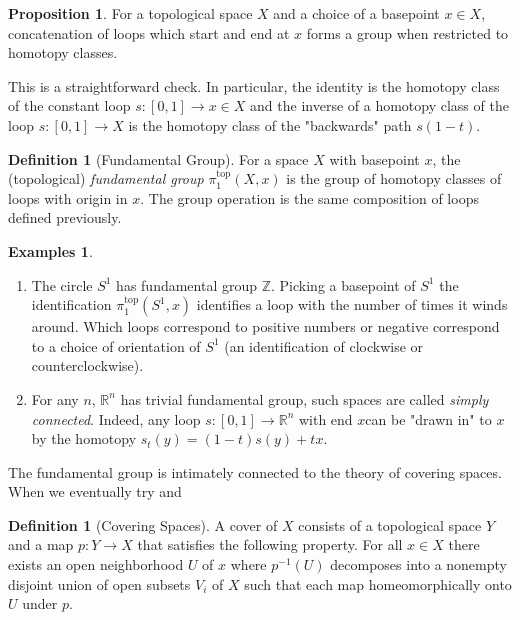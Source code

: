 \documentclass{article}
\theoremstyle{definition}
\newtheorem{proposition}[theorem]{Proposition}
\newtheorem{definition}[theorem]{Definition}
\newtheorem{examples}[theorem]{Examples}
\theoremstyle{remark}
\newcommand{\R}{\mathbb{R}}
\newcommand{\Z}{\mathbb{Z}}
\begin{document}
\begin{proposition}
	For a topological space $X$ and a choice of a basepoint $x \in X$, concatenation of loops which start and end at $x$ forms a group when restricted to homotopy classes.
\end{proposition}

This is a straightforward check. 
In particular, the identity is the homotopy class of the constant loop $s: [0,1] \to x \in X$ and the inverse of a homotopy class of the loop $s: [0,1] \to X$ is the homotopy class of the "backwards" path $s(1-t)$.

\begin{definition}[Fundamental Group]
	For a space $X$ with basepoint $x$, the (topological) \textit{fundamental group} $\pi^{\text{top}}_1(X,x)$	is the group of homotopy classes of loops with origin in $x$.
	The group operation is the same composition of loops defined previously.
\end{definition}

\begin{examples} \text{} 
	\begin{enumerate}
		\item The circle $S^1$ has fundamental group $\Z$. 
			Picking a basepoint of $S^1$ the identification $\pi_1^{\text{top}}(S^1,x)$ identifies a loop with the number of times it winds around.
			Which loops correspond to positive numbers or negative correspond to a choice of orientation of $S^1$ (an identification of clockwise or counterclockwise).
		\item For any $n$, $\R^n$ has trivial fundamental group, such spaces are called \textit{simply connected}.
			Indeed, any loop $s: [0,1] \to \R^n$ with end $x $can be "drawn in" to $x$ by the homotopy $s_t(y) = (1-t)s(y) + tx$.
	\end{enumerate}
	
\end{examples}

The fundamental group is intimately connected to the theory of covering spaces. 
When we eventually try and 
\begin{definition}[Covering Spaces]
	A cover of $X$ consists of a topological space $Y$ and a map $p:Y \to X$ that satisfies the following property. 
	For all $x \in X$ there exists an open neighborhood $U$ of $x$ where $p^{-1}(U)$ decomposes into a nonempty disjoint union of open subsets $V_i$ of $X$ such that each map homeomorphically onto $U$ under $p$.
\end{definition}
\end{document}
